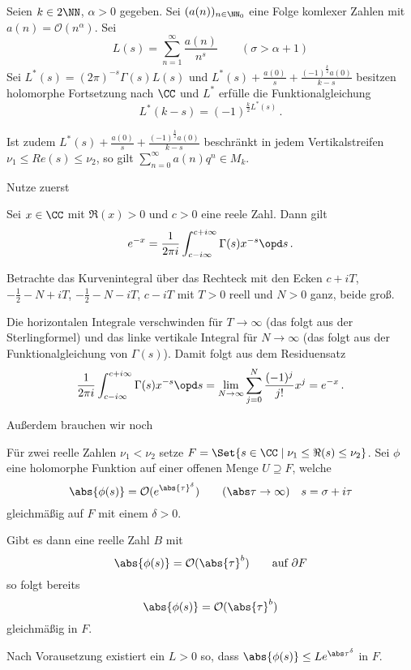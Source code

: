\begin{satz}[Hecke]
	Seien $k \in 2\NN$, $\alpha > 0$ gegeben.
	Sei $(a(n))_{n\in\NN_0}$ eine Folge komlexer Zahlen mit $a(n) = \mathcal{O}(n^\alpha)$.
	Sei
	\[
		L(s) = \sum_{n=1}^\infty \frac{a(n)}{n^s}
		\qquad (\sigma > \alpha +1)
	\]
	Sei $L^*(s) = (2\pi)^{-s} \Gamma(s) L(s)$ und $L^*(s) + \frac{a(0)}{s} + \frac{(-1)^{\frac{k}{2}} a(0)}{k-s}$ besitzen holomorphe Fortsetzung nach $\CC$ und $L^*$ erfülle die Funktionalgleichung
	\[
		L^*(k-s) = (-1)^{\frac{k}{2}L^*(s)}\,.
	\]
	
	Ist zudem $L^*(s) + \frac{a(0)}{s} + \frac{(-1)^{\frac{k}{2}} a(0)}{k-s}$ beschränkt in jedem Vertikalstreifen $\nu_1 \leq Re(s) \leq \nu_2$, so gilt $\sum_{n=0}^\infty a(n)q^n \in M_k$.
\end{satz}

\begin{bewe}
	Nutze zuerst
	\begin{satz}
		Sei $x \in \CC$ mit $\Re(x) > 0$ und $c > 0$ eine reele Zahl.
		Dann gilt
		\[
			e^{-x}
			= \frac{1}{2\pi i} \int_{c-i\infty}^{c+i\infty} \Gamma(s)x^{-s} \opd s
			\,.
		\]
	\end{satz}
	\begin{bewe}
		Betrachte das Kurvenintegral über das Rechteck mit den Ecken $c+iT$, $-\frac{1}{2}-N+iT$, $-\frac{1}{2}-N-iT$, $c-iT$ mit $T > 0$ reell und $N > 0$ ganz, beide groß.
		
		Die horizontalen Integrale verschwinden für $T \to \infty$ (das folgt aus der Sterlingformel) und das linke vertikale Integral für $N \to \infty$ (das folgt aus der Funktionalgleichung von $\Gamma(s)$).
		Damit folgt aus dem Residuensatz
		\[
			\frac{1}{2\pi i} \int_{c-i\infty}^{c+i\infty} \Gamma(s)x^{-s} \opd s
			= \lim_{N \to \infty} \sum_{j=0}^N \frac{(-1)^j}{j!} x^j = e^{-x}\,.
		\]
	\end{bewe}

	Außerdem brauchen wir noch
	\begin{lemm}
		Für zwei reelle Zahlen $\nu_1 < \nu_2$ setze $F = \Set{s \in \CC\mid \nu_1 \leq \Re(s) \leq \nu_2}$.
		Sei $\phi$ eine holomorphe Funktion auf einer offenen Menge $U \supseteq F$, welche
		\[
			\abs{\phi(s)} = \mathcal{O}(e^{\abs{\tau}^\delta})
			\qquad (\abs \tau \to \infty)\quad s= \sigma + i\tau
		\]
		gleichmäßig auf $F$ mit einem $\delta > 0$.
		
		Gibt es dann eine reelle Zahl $B$ mit
		\[
			\abs{\phi(s)} = \mathcal{O}(\abs{\tau}^b) \qquad \text{auf } \partial F
		\]
		so folgt bereits
		\[
			\abs{\phi(s)} = \mathcal{O}(\abs{\tau}^b)
		\]
		gleichmäßig in $F$.
	\end{lemm}
	\begin{bewe}
		Nach Vorausetzung existiert ein $L > 0$ so, dass $\abs{\phi(s)} \leq L e^{\abs \tau ^\delta}$ in $F$.
		

\end{bewe}
\end{bewe}
